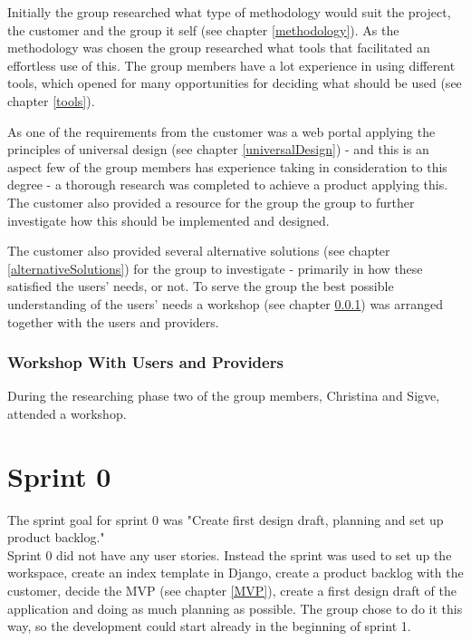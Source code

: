 Initially the group researched what type of methodology would suit the project, the customer and the group it self (see chapter \ref{methodology}). As the methodology was chosen the group researched what tools that facilitated an effortless use of this. The group members have a lot experience in using different tools, which opened for many opportunities for deciding what should be used (see chapter \ref{tools}).

As one of the requirements from the customer was a web portal applying the principles of universal design (see chapter \ref{universalDesign}) - and this is an aspect few of the group members has experience taking in consideration to this degree - a thorough research was completed to achieve a product applying this. The customer also provided a resource \cite{Difi} for the group the group to further investigate how this should be implemented and designed. 

The customer also provided several alternative solutions (see chapter \ref{alternativeSolutions}) for the group to investigate - primarily in how these satisfied the users' needs, or not. To serve the group the best possible understanding of the users' needs a workshop (see chapter \ref{workshop}) was arranged together with the users and providers. 


\subsubsection{Workshop With Users and Providers}
\label{workshop}
During the researching phase two of the group members, Christina and Sigve, attended a workshop. 



\section{Sprint 0}
The sprint goal for sprint 0 was "Create first design draft, planning and set up product backlog." \\

Sprint 0 did not have any user stories. Instead the sprint was used to set up the workspace, create an index template in Django, create a product backlog with the customer, decide the MVP (see chapter \ref{MVP}), create a first design draft of the application and doing as much planning as possible. The group chose to do it this way, so the development could start already in the beginning of sprint 1. \\

